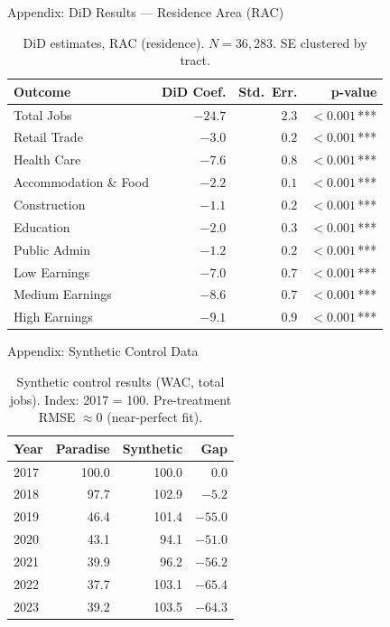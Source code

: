 \documentclass[aspectratio=169, 12pt]{beamer}
\begin{document}
\begin{frame}{Appendix: DiD Results --- Residence Area (RAC)}
  \begin{table}
    \centering
    \footnotesize
    \begin{tabular}{lrrr}
      \toprule
      \textbf{Outcome} & \textbf{DiD Coef.} & \textbf{Std.\ Err.} & \textbf{p-value} \\
      \midrule
      Total Jobs          & $-24.7$ & $2.3$ & $<0.001$\,*** \\
      \midrule
      Retail Trade        & $-3.0$  & $0.2$ & $<0.001$\,*** \\
      Health Care         & $-7.6$  & $0.8$ & $<0.001$\,*** \\
      Accommodation \& Food & $-2.2$ & $0.1$ & $<0.001$\,*** \\
      Construction        & $-1.1$  & $0.2$ & $<0.001$\,*** \\
      Education           & $-2.0$  & $0.3$ & $<0.001$\,*** \\
      Public Admin        & $-1.2$  & $0.2$ & $<0.001$\,*** \\
      \midrule
      Low Earnings        & $-7.0$  & $0.7$ & $<0.001$\,*** \\
      Medium Earnings     & $-8.6$  & $0.7$ & $<0.001$\,*** \\
      High Earnings       & $-9.1$  & $0.9$ & $<0.001$\,*** \\
      \bottomrule
    \end{tabular}
    \caption{DiD estimates, RAC (residence). $N = 36{,}283$. SE clustered by tract.}
  \end{table}
\end{frame}

\begin{frame}{Appendix: Synthetic Control Data}
  \begin{table}
    \centering
    \footnotesize
    \begin{tabular}{lrrr}
      \toprule
      \textbf{Year} & \textbf{Paradise} & \textbf{Synthetic} & \textbf{Gap} \\
      \midrule
      2017 & 100.0 & 100.0 &   0.0 \\
      2018 &  97.7 & 102.9 &  $-5.2$ \\
      2019 &  46.4 & 101.4 & $-55.0$ \\
      2020 &  43.1 &  94.1 & $-51.0$ \\
      2021 &  39.9 &  96.2 & $-56.2$ \\
      2022 &  37.7 & 103.1 & $-65.4$ \\
      2023 &  39.2 & 103.5 & $-64.3$ \\
      \bottomrule
    \end{tabular}
    \caption{Synthetic control results (WAC, total jobs). Index: 2017 = 100.
    Pre-treatment RMSE $\approx 0$ (near-perfect fit).}
  \end{table}
\end{frame}
\end{document}
